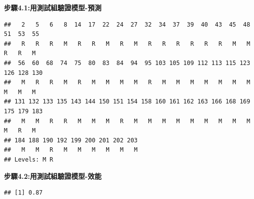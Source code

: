 \documentclass[
]{book}
\newenvironment{Shaded}{\begin{snugshade}}{\end{snugshade}}
\newcommand{\CommentTok}[1]{\textcolor[rgb]{0.56,0.35,0.01}{\textit{#1}}}
\newcommand{\DataTypeTok}[1]{\textcolor[rgb]{0.13,0.29,0.53}{#1}}
\newcommand{\FloatTok}[1]{\textcolor[rgb]{0.00,0.00,0.81}{#1}}
\newcommand{\KeywordTok}[1]{\textcolor[rgb]{0.13,0.29,0.53}{\textbf{#1}}}
\newcommand{\NormalTok}[1]{#1}
\newcommand{\OperatorTok}[1]{\textcolor[rgb]{0.81,0.36,0.00}{\textbf{#1}}}
\newcommand{\StringTok}[1]{\textcolor[rgb]{0.31,0.60,0.02}{#1}}
\begin{document}
\textbf{步驟4.1:用測試組驗證模型-預測}

\begin{Shaded}
\end{Shaded}

\begin{verbatim}
##   2   5   6   8  14  17  22  24  27  32  34  37  39  40  43  45  48  51  53  55 
##   R   R   R   M   R   R   M   R   M   R   R   R   R   R   R   M   M   R   R   M 
##  56  60  68  74  75  80  83  84  94  95 103 105 109 112 113 115 123 126 128 130 
##   M   R   R   M   R   M   M   M   M   R   M   M   M   M   M   M   M   M   M   M 
## 131 132 133 135 143 144 150 151 154 158 160 161 162 163 166 168 169 175 179 183 
##   M   M   R   R   M   M   M   R   M   M   M   M   M   M   M   M   M   M   R   M 
## 184 188 190 192 199 200 201 202 203 
##   M   M   R   M   M   M   M   M   M 
## Levels: M R
\end{verbatim}

\textbf{步驟4.2:用測試組驗證模型-效能}

\begin{Shaded}
\end{Shaded}

\begin{verbatim}
## [1] 0.87
\end{verbatim}

\begin{Shaded}
\end{Shaded}
\end{document}
